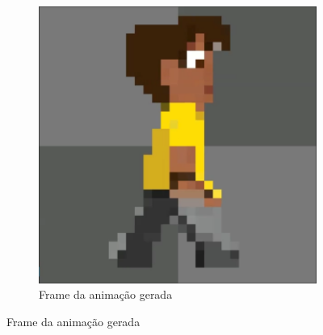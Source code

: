 \begin{figure}[htbp]
\begin{subfigure}{0.35\linewidth}
        \includegraphics[width=1\linewidth]{figs/pixelLab/dia4/print2.PNG}
        \caption{\small Frame da animação gerada}
        \label{fig:pixelLabAnimacao8b}
    \end{subfigure}
\end{figure}

